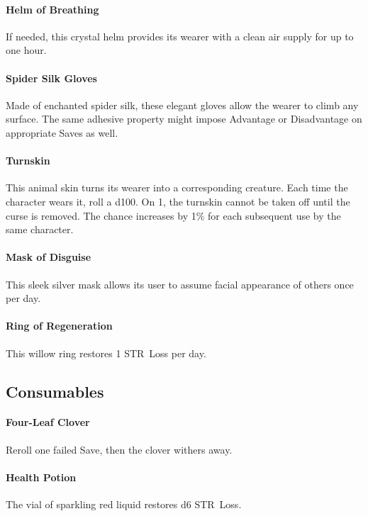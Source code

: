 \documentclass[itdr]{subfiles}
\begin{document}
\paragraph{Helm of Breathing}
If needed, this crystal helm provides its wearer with a clean air supply  for up to one hour.

\paragraph{Spider Silk Gloves}
Made of enchanted spider silk, these elegant gloves allow the wearer to climb any surface. The same adhesive property might impose Advantage or Disadvantage on appropriate Saves as well.

\paragraph{Turnskin}
This animal skin turns its wearer into a corresponding creature. Each time the character wears it, roll a d100. On 1, the turnskin cannot be taken off until the curse is removed. The chance increases by 1\% for each subsequent use by the same character.

\paragraph{Mask of Disguise}
This sleek silver mask allows its user to assume \mbox{facial} appearance of others once per day.

\paragraph{Ring of Regeneration}
This willow ring restores 1 STR~Loss per day.



\subsection*{Consumables}

\paragraph{Four-Leaf Clover}
Reroll one failed Save, then the clover withers away.

\paragraph{Health Potion}
The vial of sparkling red liquid restores d6 STR~Loss.
\end{document}
